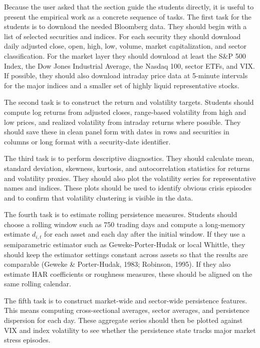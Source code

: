 \documentclass[12pt]{article}
\begin{document}
Because the user asked that the section guide the students directly, it is useful to present the empirical work as a concrete sequence of tasks. The first task for the students is to download the needed Bloomberg data. They should begin with a list of selected securities and indices. For each security they should download daily adjusted close, open, high, low, volume, market capitalization, and sector classification. For the market layer they should download at least the S&P 500 Index, the Dow Jones Industrial Average, the Nasdaq 100, sector ETFs, and VIX. If possible, they should also download intraday price data at 5-minute intervals for the major indices and a smaller set of highly liquid representative stocks.

The second task is to construct the return and volatility targets. Students should compute log returns from adjusted closes, range-based volatility from high and low prices, and realized volatility from intraday returns where possible. They should save these in clean panel form with dates in rows and securities in columns or long format with a security-date identifier.

The third task is to perform descriptive diagnostics. They should calculate mean, standard deviation, skewness, kurtosis, and autocorrelation statistics for returns and volatility proxies. They should also plot the volatility series for representative names and indices. These plots should be used to identify obvious crisis episodes and to confirm that volatility clustering is visible in the data.

The fourth task is to estimate rolling persistence measures. Students should choose a rolling window such as 750 trading days and compute a long-memory estimate $d_{i,t}$ for each asset and each day after the initial window. If they use a semiparametric estimator such as Geweke-Porter-Hudak or local Whittle, they should keep the estimator settings constant across assets so that the results are comparable (Geweke \& Porter-Hudak, 1983; Robinson, 1995). If they also estimate HAR coefficients or roughness measures, these should be aligned on the same rolling calendar.

The fifth task is to construct market-wide and sector-wide persistence features. This means computing cross-sectional averages, sector averages, and persistence dispersion for each day. These aggregate series should then be plotted against VIX and index volatility to see whether the persistence state tracks major market stress episodes.
\end{document}
